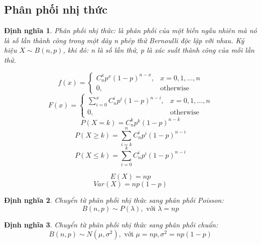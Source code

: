 \documentclass[12pt]{article}
\newtheorem{thm}{Định nghĩa}
\begin{document}
\subsection{Phân phối nhị thức}
\begin{thm}
    Phân phối nhị thức: là phân phối của một biến ngẫu nhiên mà nó là số lần thành công trong một dãy n phép thử Bernoulli độc lập với nhau. Ký hiệu $X \sim B(n, p)$, khi đó:
    n là số lần thử, p là xác suất thành công của mỗi lần thử.
    
    \begin{equation}
    f(x) = \begin{cases}
        C_n^x p^x(1-p)^{n-x}, & x = 0, 1, \dots, n \\
    0, & \text{otherwise}
    \end{cases}
    \end{equation}
    \begin{equation}
    F(x) = \begin{cases}
    \sum_{i=0}^x C_n^i p^i(1-p)^{n-i}, & x = 0, 1, \dots, n \\
    0, & \text{otherwise}
    \end{cases}
    \end{equation}
    \begin{equation}
        P(X = k) = C_n^k p^k(1-p)^{n-k}
    \end{equation}
    \begin{equation}
        P(X \geq k) = \sum_{i=k}^n C_n^i p^i(1-p)^{n-i}
    \end{equation}
    \begin{equation}
        P(X \leq k) = \sum_{i=0}^k C_n^i p^i(1-p)^{n-i}
    \end{equation}

    \begin{equation}
    E(X) = np
    \end{equation}
    \begin{equation}
    Var(X) = np(1 - p)
    \end{equation}
\end{thm}

\begin{thm}
    Chuyển từ phân phối nhị thức sang phân phối Poisson:
    \begin{equation}
    B(n, p) \sim P(\lambda), \text{ với } \lambda = np
    \end{equation}

\end{thm}
\begin{thm}
    Chuyển từ phân phối nhị thức sang phân phối chuẩn:
    \begin{equation}
    B(n, p) \sim N(\mu, \sigma^2), \text{ với } \mu = np, \sigma^2 = np(1 - p)
    \end{equation}

\end{thm}
 
\end{document}
